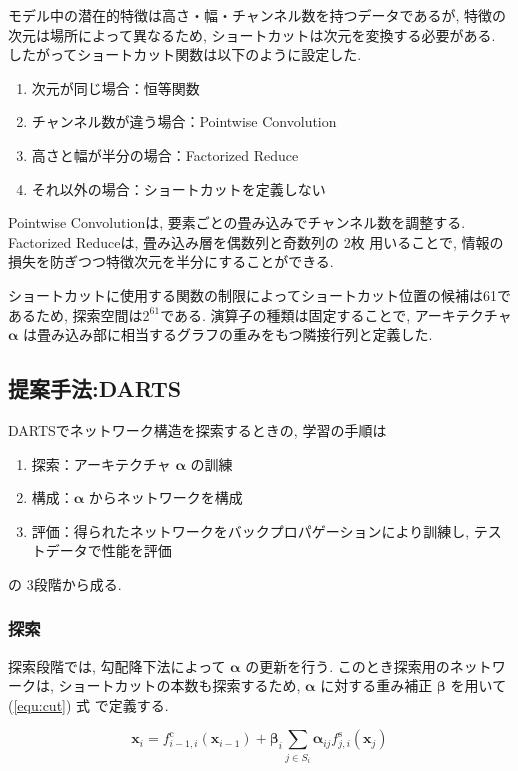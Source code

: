 モデル中の潜在的特徴は高さ・幅・チャンネル数を持つデータであるが,
特徴の次元は場所によって異なるため, ショートカットは次元を変換する必要がある.
したがってショートカット関数は以下のように設定した.
\begin{enumerate}
  \item 次元が同じ場合：恒等関数
  \item チャンネル数が違う場合：Pointwise Convolution
  \item 高さと幅が半分の場合：Factorized Reduce
  \item それ以外の場合：ショートカットを定義しない
\end{enumerate}
Pointwise Convolutionは, 要素ごとの畳み込みでチャンネル数を調整する.
Factorized Reduceは, 畳み込み層を偶数列と奇数列の 2枚 用いることで, 情報の損失を防ぎつつ特徴次元を半分にすることができる.

ショートカットに使用する関数の制限によってショートカット位置の候補は61であるため,
探索空間は$2^{61}$である.
演算子の種類は固定することで, アーキテクチャ $\bm{\alpha}$ は畳み込み部に相当するグラフの重みをもつ隣接行列と定義した.


\changeindent{0cm}
\subsection{提案手法:DARTS}
\label{sec:pred.01}
\changeindent{2cm}

DARTSでネットワーク構造を探索するときの, 学習の手順は
\begin{enumerate}
  \item 探索：アーキテクチャ $\bm{\alpha}$ の訓練
  \item 構成：$\bm{\alpha}$ からネットワークを構成
  \item 評価：得られたネットワークをバックプロパゲーションにより訓練し, テストデータで性能を評価
\end{enumerate}
の 3段階から成る.


\subsubsection{探索}

探索段階では, 勾配降下法によって $\bm{\alpha}$ の更新を行う.
このとき探索用のネットワークは, ショートカットの本数も探索するため,
$\bm{\alpha}$ に対する重み補正 $\bm{\beta}$ を用いて (\ref{equ:cut}) 式 で定義する.

\begin{equation}
  \label{equ:cut}
  \bm{x}_i = f^{\mathrm{c}}_{i-1, i}(\bm{x}_{i-1}) + \bm{\beta}_i \sum_{j \in S_i} \bm{\alpha}_{ij} f^{\mathrm{s}}_{j, i} (\bm{x}_j)
\end{equation}

